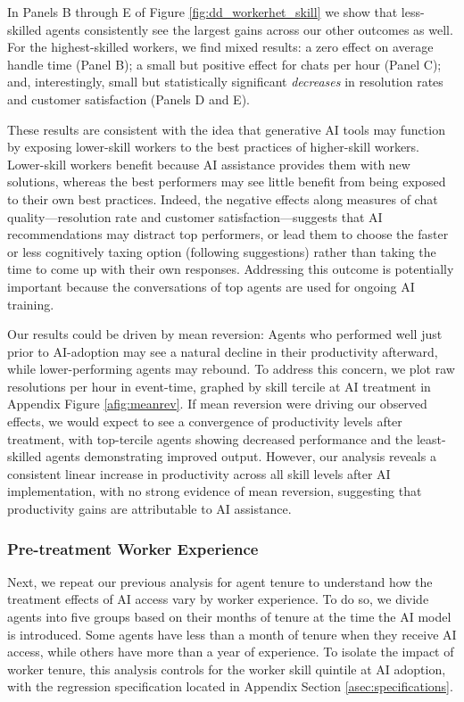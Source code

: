 \documentclass[11pt]{article}
\begin{document}
In Panels B through E of Figure \ref{fig:dd_workerhet_skill} we show that less-skilled agents consistently see the largest gains across our other outcomes as well.  For the highest-skilled workers, we find mixed results: a zero effect on average handle time (Panel B); a small but positive effect for chats per hour (Panel C); and, interestingly, small but statistically significant \textit{decreases} in resolution rates and customer satisfaction (Panels D and E).  

These results are consistent with the idea that generative AI tools may function by exposing lower-skill workers to the best practices of higher-skill workers.  Lower-skill workers benefit because AI assistance provides them with new solutions, whereas the best performers may see little benefit from being exposed to their own best practices.  Indeed, the negative effects along measures of chat quality---resolution rate and customer satisfaction---suggests that AI recommendations may distract top performers, or lead them to choose the faster or less cognitively taxing option (following suggestions) rather than taking the time to come up with their own responses.  Addressing this outcome is potentially important because the conversations of top agents are used for ongoing AI training.

Our results could be driven by mean reversion: Agents who performed well just prior to AI-adoption may see a natural decline in their productivity afterward, while lower-performing agents may rebound.  To address this concern, we plot raw resolutions per hour in event-time, graphed by skill tercile at AI treatment in Appendix Figure \ref{afig:meanrev}. If mean reversion were driving our observed effects, we would expect to see a convergence of productivity levels after treatment, with top-tercile agents showing decreased performance and the least-skilled agents demonstrating improved output. However, our analysis reveals a consistent linear increase in productivity across all skill levels after AI implementation, with no strong evidence of mean reversion, suggesting that productivity gains are attributable to AI assistance.

\subsubsection{Pre-treatment Worker Experience}
Next, we repeat our previous analysis for agent tenure to understand how the treatment effects of AI access vary by worker experience. To do so, we divide agents into five groups based on their months of tenure at the time the AI model is introduced.  Some agents have less than a month of tenure when they receive AI access, while others have more than a year of experience.  To isolate the impact of worker tenure, this analysis controls for the worker skill quintile at AI adoption, with the regression specification located in Appendix Section \ref{asec:specifications}. 
\end{document}

